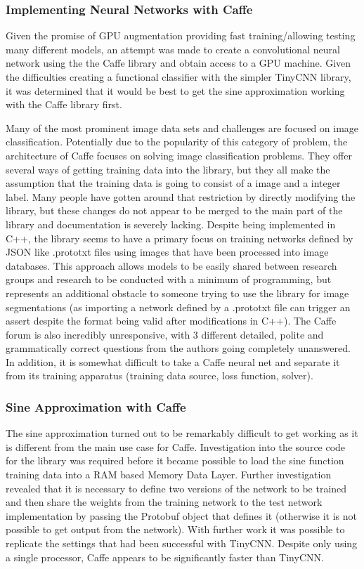 \documentclass[12pt]{article}
\begin{document}
\subsubsection{Implementing Neural Networks with Caffe}

	Given the promise of GPU augmentation providing fast training/allowing testing many different models, an attempt was made to create a convolutional neural network using the the Caffe library and obtain access to a GPU machine.  Given the difficulties creating a functional classifier with the simpler TinyCNN library, it was determined that it would be best to get the sine approximation working with the Caffe library first.

	Many of the most prominent image data sets and challenges are focused on image classification.  Potentially due to the popularity of this category of problem, the architecture of Caffe focuses on solving image classification problems.  They offer several ways of getting training data into the library, but they all make the assumption that the training data is going to consist of a image and a integer label.  Many people have gotten around that restriction by directly modifying the library, but these changes do not appear to be merged to the main part of the library and documentation is severely lacking.  Despite being implemented in C++, the library seems to have a primary focus on training networks defined by JSON like .prototxt files using images that have been processed into image databases.  This approach allows models to be easily shared between research groups and research to be conducted with a minimum of programming, but represents an additional obstacle to someone trying to use the library for image segmentations (as importing a network defined by a .prototxt file can trigger an assert despite the format being valid after modifications in C++).  The Caffe forum is also incredibly unresponsive, with 3 different detailed, polite and grammatically correct questions from the authors going completely unanswered.  In addition, it is somewhat difficult to take a Caffe neural net and separate it from its training apparatus (training data source, loss function, solver).

\subsubsection{Sine Approximation with Caffe}
	The sine approximation turned out to be remarkably difficult to get working as it is different from the main use case for Caffe.  Investigation into the source code for the library was required before it became possible to load the sine function training data into a RAM based Memory Data Layer.  Further investigation revealed that it is necessary to define two versions of the network to be trained and then share the weights from the training network to the test network implementation by passing the Protobuf object that defines it (otherwise it is not possible to get output from the network).  With further work it was possible to replicate the settings that had been successful with TinyCNN.  Despite only using a single processor, Caffe appears to be significantly faster than TinyCNN.
\end{document}
